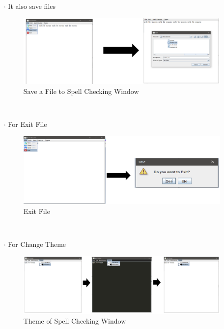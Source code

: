 \documentclass[12pt,letterpaper]{article}
\begin{document}
\begin{flushleft}
\begin{itemize}
\begin{figure}[htbp]
\end{figure} \\
  \item[$\cdot$] 
  It also save files
\begin{figure}[htbp]
    \centering
    \includegraphics[scale=0.8]{save.png}
    \caption{Save a File to Spell Checking Window}
    \label{fig:myfigure}
\end{figure} \\
  \item[$\cdot$]
  For Exit File
\begin{figure}[htbp]
    \centering
    \includegraphics[scale=0.8]{exit.png}
    \caption{Exit File}
    \label{fig:myfigure}
\end{figure} \\
\item[$\cdot$]
For Change Theme
\begin{figure}[htbp]
    \centering
    \includegraphics[scale=0.8]{changetheme.png}
    \caption{Theme of Spell Checking Window}
    \label{fig:myfigure}
\end{figure} \\
\end{itemize}

\end{flushleft}
\end{document}
